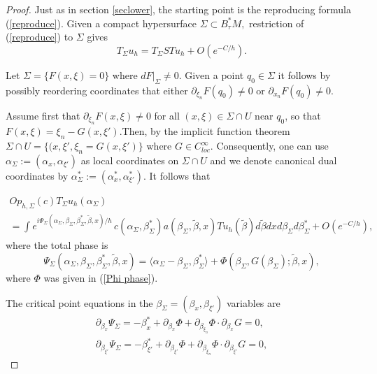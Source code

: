 \documentclass[11pt,reqno]{amsart}
\theoremstyle{definition}
\begin{document}
\begin{proof}Just as in section \ref{seclower}, the starting point is the reproducing formula (\ref{reproduce}). Given a compact hypersurface $\Sigma \subset B_{\tau}^*M,$ restriction of (\ref{reproduce}) to $\Sigma$ gives
\begin{equation} \label{wfr1}
T_\Sigma u_h =  T_{\Sigma}S T u_h + O(e^{-C/h}).
\end{equation}


Let $\Sigma = \{ F(x,\xi) = 0 \}$ where $dF |_{\Sigma} \neq 0.$  Given a point $q_0  \in \Sigma$ it follows by possibly reordering coordinates that either $\partial_{\xi_n} F(q_0) \neq 0$ or $\partial_{x_n} F (q_0) \neq 0.$

Assume first that $\partial_{\xi_n} F (x,\xi) \neq 0$ for all $(x,\xi) \in \Sigma \cap U$ near $q_0$, so that $F(x,\xi)=\xi_n-G(x,\xi')$.Then, by the implicit function theorem $ \Sigma \cap U = \{ (x, \xi', \xi_n = G(x,\xi') \}$ where $G \in C^{\infty}_{loc}.$ Consequently, one can use $\alpha_{\Sigma} := (\alpha_x, \alpha_{\xi'})$ as local coordinates on $\Sigma \cap U$ and we denote canonical dual coordinates by $\alpha_{\Sigma}^*:= (\alpha_x^*,\alpha_{\xi'}^*).$ It follows that


\begin{align} \label{wfr2}
Op_{h,\Sigma}(c)  T_{\Sigma} u_h (\alpha_{\Sigma})  \hspace{4in} \nonumber \\
= \int e^{i \Psi_{\Sigma}(\alpha_{\Sigma}, \beta_{\Sigma}, \beta_{\Sigma}^*, \tilde{\beta},x)/h} \, c(\alpha_{\Sigma}, \beta_{\Sigma}^*) a (\beta_{\Sigma}, \tilde{\beta},x) Tu_h(\tilde{\beta}) d\tilde{\beta}  dx d\beta_{\Sigma} d \beta_{\Sigma}^*  + O(e^{-C/h}),
\end{align}
where the total phase is
\begin{equation} \label{wfr3}
\Psi_{\Sigma}(\alpha_{\Sigma}, \beta_{\Sigma},\beta_\Sigma^*,\tilde{\beta},x) = \langle \alpha_{\Sigma} - \beta_{\Sigma}, \beta_{\Sigma}^* \rangle + \Phi( \beta_\Sigma, G(\beta_{\Sigma}); \tilde{\beta},x),
\end{equation}
where $\Phi$ was given in (\ref{Phi phase}).

The critical point equations in the $\beta_{\Sigma} = (\beta_x, \beta_{\xi'})$ variables are
\begin{eqnarray} \label{wfr4}
\partial_{\beta_x} \Psi_{\Sigma} = - \beta_{x}^* + \partial_{\beta_x} \Phi + \partial_{\beta_{\xi_n}} \Phi \cdot \partial_{\beta_x} G = 0, \nonumber \\
\partial_{\beta_{\xi'}} \Psi_{\Sigma} = - \beta_{\xi'}^* + \partial_{\beta_{\xi'}} \Phi  + \partial_{\beta_{\xi_n}} \Phi \cdot \partial_{\beta_{\xi'}} G = 0,
\end{eqnarray}


\end{proof}
\end{document}
